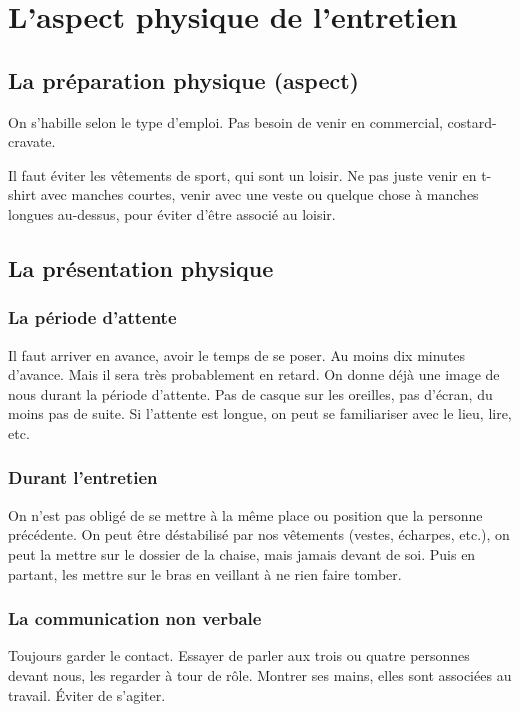 \section{L'aspect physique de l'entretien}
\subsection{La préparation physique (aspect)}
On s'habille selon le type d'emploi. Pas besoin de venir en commercial, costard-cravate.

Il faut éviter les vêtements de sport, qui sont un loisir. Ne pas juste venir en t-shirt avec manches courtes, venir avec une veste ou quelque chose à manches longues au-dessus, pour éviter d'être associé au loisir.

\subsection{La présentation physique}
\subsubsection{La période d'attente}
Il faut arriver en avance, avoir le temps de se poser. Au moins dix minutes d'avance. Mais il sera très probablement en retard. On donne déjà une image de nous durant la période d'attente. Pas de casque sur les oreilles, pas d'écran, du moins pas de suite. Si l'attente est longue, on peut se familiariser avec le lieu, lire, etc.

\subsubsection{Durant l'entretien}
On n'est pas obligé de se mettre à la même place ou position que la personne précédente. On peut être déstabilisé par nos vêtements (vestes, écharpes, etc.), on peut la mettre sur le dossier de la chaise, mais jamais devant de soi. Puis en partant, les mettre sur le bras en veillant à ne rien faire tomber.

\subsubsection{La communication non verbale}
Toujours garder le contact. Essayer de parler aux trois ou quatre personnes devant nous, les regarder à tour de rôle. Montrer ses mains, elles sont associées au travail. Éviter de s'agiter.
